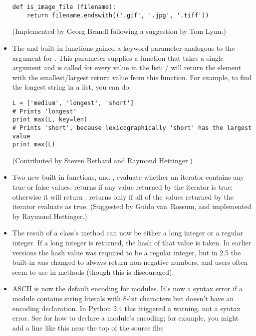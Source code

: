 \documentclass{howto}
\begin{document}
\begin{itemize}
\begin{verbatim}
def is_image_file (filename):
    return filename.endswith(('.gif', '.jpg', '.tiff'))
\end{verbatim}

(Implemented by Georg Brandl following a suggestion by Tom Lynn.)

\item The  and  built-in functions
gained a  keyword parameter analogous to the 
argument for .  This parameter supplies a function that
takes a single argument and is called for every value in the list;
/ will return the element with the 
smallest/largest return value from this function.
For example, to find the longest string in a list, you can do:

\begin{verbatim}
L = ['medium', 'longest', 'short']
# Prints 'longest'
print max(L, key=len)              
# Prints 'short', because lexicographically 'short' has the largest value
print max(L)         
\end{verbatim}

(Contributed by Steven Bethard and Raymond Hettinger.)

\item Two new built-in functions,  and
, evaluate whether an iterator contains any true or
false values.   returns  if any value
returned by the iterator is true; otherwise it will return
.   returns  only if
all of the values returned by the iterator evaluate as true.
(Suggested by Guido van~Rossum, and implemented by Raymond Hettinger.)

\item The result of a class's  method can now 
be either a long integer or a regular integer.  If a long integer is
returned, the hash of that value is taken.  In earlier versions the
hash value was required to be a regular integer, but in 2.5 the
 built-in was changed to always return non-negative
numbers, and users often seem to use  in
 methods (though this is discouraged).

\item ASCII is now the default encoding for modules.  It's now 
a syntax error if a module contains string literals with 8-bit
characters but doesn't have an encoding declaration.  In Python 2.4
this triggered a warning, not a syntax error.  See  
for how to declare a module's encoding; for example, you might add 
a line like this near the top of the source file:


\end{itemize}
\end{document}
